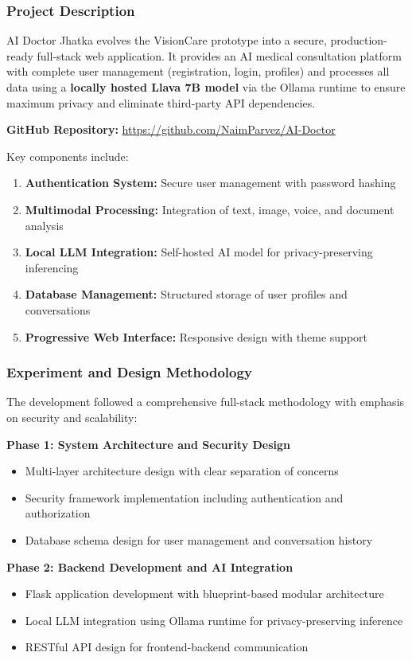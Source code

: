 \documentclass[12pt,a4paper]{article}
\begin{document}
\subsubsection{Project Description}
AI Doctor Jhatka evolves the VisionCare prototype into a secure, production-ready full-stack web application. It provides an AI medical consultation platform with complete user management (registration, login, profiles) and processes all data using a \textbf{locally hosted Llava 7B model} via the Ollama runtime to ensure maximum privacy and eliminate third-party API dependencies.

\textbf{GitHub Repository:} \url{https://github.com/NaimParvez/AI-Doctor}

Key components include:
\begin{enumerate}
    \item \textbf{Authentication System:} Secure user management with password hashing
    \item \textbf{Multimodal Processing:} Integration of text, image, voice, and document analysis
    \item \textbf{Local LLM Integration:} Self-hosted AI model for privacy-preserving inferencing
    \item \textbf{Database Management:} Structured storage of user profiles and conversations
    \item \textbf{Progressive Web Interface:} Responsive design with theme support
\end{enumerate}

\subsubsection{Experiment and Design Methodology}
The development followed a comprehensive full-stack methodology with emphasis on security and scalability:

\textbf{Phase 1: System Architecture and Security Design}
\begin{itemize}
    \item Multi-layer architecture design with clear separation of concerns
    \item Security framework implementation including authentication and authorization
    \item Database schema design for user management and conversation history
\end{itemize}

\textbf{Phase 2: Backend Development and AI Integration}
\begin{itemize}
    \item Flask application development with blueprint-based modular architecture
    \item Local LLM integration using Ollama runtime for privacy-preserving inference
    \item RESTful API design for frontend-backend communication
\end{itemize}
\end{document}
